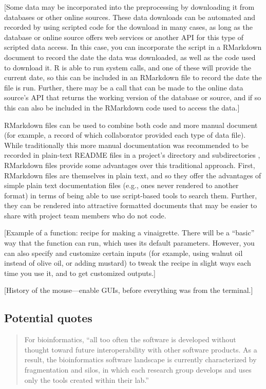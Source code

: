 \documentclass[]{tufte-book}
\begin{document}
{[}Some data may be incorporated into the preprocessing by downloading it from
databases or other online sources. These data downloads can be automated and
recorded by using scripted code for the download in many cases, as long as the
database or online source offers web services or another API for this type of
scripted data access. In this case, you can incorporate the script in a
RMarkdown document to record the date the data was downloaded, as well as the
code used to download it. R is able to run system calls, and one of these
will provide the current date, so this can be included in an RMarkdown file
to record the date the file is run. Further, there may be a call that can
be made to the online data source's API that returns the working version of
the database or source, and if so this can also be included in the RMarkdown
code used to access the data.{]}

RMarkdown files can be used to combine both code and more manual document
(for example, a record of which collaborator provided each type of data file).
While traditionally this more manual documentation was recommended to be
recorded in plain-text README files in a project's directory and subdirectories
\citep{buffalo2015bioinformatics}, RMarkdown files provide some advantages over
this traditional approach. First, RMarkdown files are themselves in plain
text, and so they offer the advantages of simple plain text documentation
files (e.g., ones never rendered to another format) in terms of being able
to use script-based tools to search them. Further, they can be rendered into
attractive formatted documents that may be easier to share with project
team members who do not code.

{[}Example of a function: recipe for making a vinaigrette. There will be a
``basic'' way that the function can run, which uses its default parameters.
However, you can also specify and customize certain inputs (for example,
using walnut oil instead of olive oil, or adding mustard) to tweak the
recipe in slight ways each time you use it, and to get customized outputs.{]}

{[}History of the mouse---enable GUIs, before everything was from the terminal.{]}

\hypertarget{potential-quotes}{%
\subsection{Potential quotes}\label{potential-quotes}}

\begin{quote}
For bioinformatics, ``all too often the software is developed without
thought toward future interoperability with other software products. As a
result, the bioinformatics software landscape is currently characterized
by fragmentation and silos, in which each research group develops and uses
only the tools created within their lab.'' \citep{barga2011bioinformatics}
\end{quote}
\end{document}
